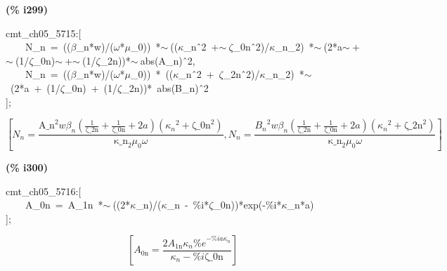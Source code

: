 \documentclass[fleqn]{article}
\begin{document}
\noindent
\begin{minipage}[t]{4.000000em}\color{red}\bfseries
(\% i299)	
\end{minipage}
\begin{minipage}[t]{\textwidth}\color{blue}
cmt\_ch05\_5715:[\\
\ \ \ \ N\_n\ =\ ((\ensuremath{\beta}\_n*w)/(\ensuremath{\omega}*\ensuremath{\mu}\_0))\ *\ensuremath{\sim\ }((\ensuremath{\kappa}\_n\^\ 2\ +\ensuremath{\sim\ }\ensuremath{\zeta}\_0n\^\ 2)/\ensuremath{\kappa}\_n\_2)\ *\ensuremath{\sim\ }(2*a\ensuremath{\sim\ }+\ensuremath{\sim\ }(1/\ensuremath{\zeta}\_0n)\ensuremath{\sim\ }+\ensuremath{\sim\ }(1/\ensuremath{\zeta}\_2n))*\ensuremath{\sim\ }abs(A\_n)\^\ 2,\\
\ \ \ \ N\_n\ =\ ((\ensuremath{\beta}\_n*w)/(\ensuremath{\omega}*\ensuremath{\mu}\_0))\ *\ ((\ensuremath{\kappa}\_n\^\ 2\ +\ \ensuremath{\zeta}\_2n\^\ 2)/\ensuremath{\kappa}\_n\_2)\ *\ensuremath{\sim\ }\ (2*a\ +\ (1/\ensuremath{\zeta}\_0n)\ +\ (1/\ensuremath{\zeta}\_2n))*\ abs(B\_n)\^\ 2\\
];
\end{minipage}
\[\displaystyle \tag{\% o299} 
\operatorname{[}{N_n}=\frac{{{\ensuremath{\mathrm{A\_ n}}}^{2}} w {{\beta }_n} \left( \frac{1}{\ensuremath{\mathrm{\zeta \_ 2n}}}+\frac{1}{\ensuremath{\mathrm{\zeta \_ 0n}}}+2 a\right)  \left( {{{{\kappa }_n}}^{2}}+{{\ensuremath{\mathrm{\zeta \_ 0n}}}^{2}}\right) }{{{\ensuremath{\mathrm{\kappa \_ n}}}_2} {{\mu }_0} \omega }\operatorname{,}{N_n}=
\frac{{{{B_n}}^{2}} w {{\beta }_n} \left( \frac{1}{\ensuremath{\mathrm{\zeta \_ 2n}}}+\frac{1}{\ensuremath{\mathrm{\zeta \_ 0n}}}+2 a\right)  \left( {{{{\kappa }_n}}^{2}}+{{\ensuremath{\mathrm{\zeta \_ 2n}}}^{2}}\right) }{{{\ensuremath{\mathrm{\kappa \_ n}}}_2} {{\mu }_0} \omega }\operatorname{]}\mbox{}
\]


\noindent
\begin{minipage}[t]{4.000000em}\color{red}\bfseries
(\% i300)	
\end{minipage}
\begin{minipage}[t]{\textwidth}\color{blue}
cmt\_ch05\_5716:[\\
\ \ \ \ A\_0n\ =\ A\_1n\ *\ensuremath{\sim\ }((2*\ensuremath{\kappa}\_n)/(\ensuremath{\kappa}\_n\ -\ \%i*\ensuremath{\zeta}\_0n))*exp(-\%i*\ensuremath{\kappa}\_n*a)\\
];
\end{minipage}
\[\displaystyle \tag{\% o300} 
\left[ {A_{\ensuremath{\mathrm{0n}}}}=\frac{2 {A_{\ensuremath{\mathrm{1n}}}} {{\kappa }_n} {{\% e}^{-\% i a {{\kappa }_n}}}}{{{\kappa }_n}-\% i \ensuremath{\mathrm{\zeta \_ 0n}}}\right] \mbox{}
\]
\end{document}
